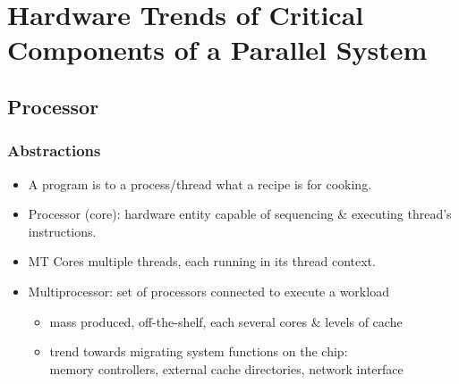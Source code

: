 \documentclass{beamer}
\newcommand{\emp}[1]{\textcolor{DikuRed}{ #1}}
\begin{document}

\section{Hardware Trends of Critical Components of a Parallel System}

\begin{frame}[fragile]
	\tableofcontents[currentsection]
\end{frame}

\subsection{Processor}

\begin{frame}[fragile,t]
\frametitle{Abstractions}
\medskip

\begin{itemize}
    \item A \emp{program} is to a \emp{process/thread} 
            what a recipe is for cooking.\smallskip

    \item \emp{Processor (core)}: hardware entity capable of
            sequencing \& executing thread's instructions.\smallskip

    \item \emp{MT Cores} multiple threads, each 
            running in its thread context.\smallskip

    \item \emp{Multiprocessor:} set of processors connected to execute a workload
        \begin{itemize}
            \item mass produced, off-the-shelf, each several cores \& levels of cache
            \item trend towards migrating system functions on the chip:\\
                    memory controllers, external cache directories, network interface
        \end  {itemize}
\end{itemize}


\end{frame}
\end{document}

